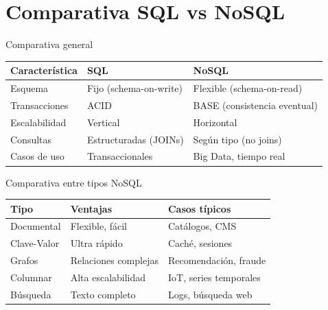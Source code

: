 \documentclass[aspectratio=169, 10pt, xcolor=table]{beamer}
\begin{document}
\section{Comparativa SQL vs NoSQL}

\begin{frame}{Comparativa general}
    \begin{table}
        \centering
        \begin{tabular}{l|l|l}
            \toprule
            Característica & SQL & NoSQL \\
            \midrule
            Esquema & Fijo (schema-on-write) & Flexible (schema-on-read) \\
            Transacciones & ACID & BASE (consistencia eventual) \\
            Escalabilidad & Vertical & Horizontal \\
            Consultas & Estructuradas (JOINs) & Según tipo (no joins) \\
            Casos de uso & Transaccionales & Big Data, tiempo real \\
            \bottomrule
        \end{tabular}
    \end{table}
\end{frame}

\begin{frame}{Comparativa entre tipos NoSQL}
    \begin{table}
        \centering
        \begin{tabular}{l|l|l}
            \toprule
            Tipo & Ventajas & Casos típicos \\
            \midrule
            Documental & Flexible, fácil & Catálogos, CMS \\
            Clave-Valor & Ultra rápido & Caché, sesiones \\
            Grafos & Relaciones complejas & Recomendación, fraude \\
            Columnar & Alta escalabilidad & IoT, series temporales \\
            Búsqueda & Texto completo & Logs, búsqueda web \\
            \bottomrule
        \end{tabular}
    \end{table}
\end{frame}
\end{document}
